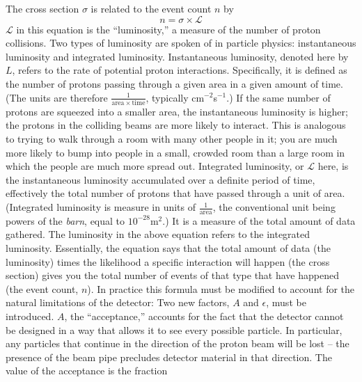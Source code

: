 The cross section $\sigma$ is related to the event count $n$ by 
\[
n = \sigma \times \mathcal{ L }
\]
$\mathcal{ L }$ in this equation is the ``luminosity,'' 
a measure of the number of proton collisions.  
Two types of luminosity are spoken of in particle physics: 
instantaneous luminosity and integrated luminosity.  
Instantaneous luminosity, denoted here by $L$, 
refers to the rate of potential proton interactions.  
Specifically, it is defined as the number of protons 
passing through a given area in a given amount of time.  
(The units are therefore 
$\frac{1}{\mathrm{area} \times \mathrm{time}}$, 
typically cm$^{-2}$s$^{-1}$.)  
If the same number of protons are squeezed into a smaller area, 
the instantaneous luminosity is higher; 
the protons in the colliding beams are more likely to interact.  
This is analogous to trying to walk through a room with many 
other people in it; 
you are much more likely to bump into people in a small, crowded room 
than a large room in which the people are much more spread out.  
Integrated luminosity, or $\mathcal{ L }$ here, 
is the instantaneous luminosity accumulated 
over a definite period of time, 
effectively the total number of protons 
that have passed through a unit of area.  
(Integrated luminosity is measure in units of 
$\frac{1}{\mathrm{area}}$, the conventional unit 
being powers of the \textit{barn}, 
equal to $10^{-28}\mathrm{m}^2$.)
It is a measure of the total amount of data gathered.  
The luminosity in the above equation refers to 
the integrated luminosity.  
Essentially, the equation says that 
the total amount of data (the luminosity) 
times the likelihood a specific interaction will happen 
(the cross section) 
gives you the total number of events of that type 
that have happened (the event count, $n$).  
In practice this formula must be modified 
to account for the natural limitations of the detector: 
Two new factors, $A$ and $\epsilon$, must be introduced.  
$A$, the ``acceptance,'' accounts for the fact 
that the detector cannot be designed in a way 
that allows it to see every possible particle.  
In particular, any particles that continue 
in the direction of the proton beam will be lost -- 
the presence of the beam pipe precludes 
detector material in that direction.  
The value of the acceptance is the fraction 
